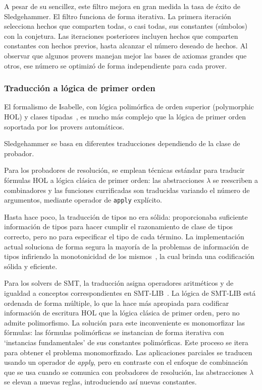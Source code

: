 \documentclass[12pt]{book}
\begin{document}
A pesar de su sencillez, este filtro mejora en gran medida la tasa de éxito de Sledgehammer. El filtro funciona de forma iterativa. La primera iteración selecciona hechos que comparten todas, o casi todas, sus constantes (símbolos) con la conjetura. Las iteraciones posteriores incluyen hechos que comparten constantes con hechos previos, hasta alcanzar el número deseado de hechos. Al observar que algunos provers manejan mejor las bases de axiomas grandes que otros, ese número se optimizó de forma independiente para cada prover.

\subsubsection{Traducción a lógica de primer orden}

El formalismo de Isabelle, con lógica polimórfica de orden superior (polymorphic HOL) y clases tipadas~\cite{proof_processing_Isabelle}, es mucho más complejo que la lógica de primer orden soportada por los provers automáticos.

Sledgehammer se basa en diferentes traducciones dependiendo de la clase de probador.

Para los probadores de resolución, se emplean técnicas estándar para traducir fórmulas HOL a lógica clásica de primer orden: las abstracciones $\lambda$ se reescriben a combinadores y las funciones currificadas son traducidas variando el número de argumentos, mediante operador de \texttt{apply} explícito.

Hasta hace poco, la traducción de tipos no era sólida: proporcionaba suficiente información de tipos para hacer cumplir el razonamiento de clase de tipos correcto, pero no para especificar el tipo de cada término. La implementación actual soluciona de forma segura la mayoría de la problemas de información de tipos infiriendo la monotonicidad de los mismos~\cite{monotonicity_inference_for_hol}, la cual brinda una codificación sólida y eficiente.

Para los solvers de SMT, la traducción asigna operadores aritméticos y de igualdad a conceptos correspondientes en SMT-LIB~\cite{SMT-LIB}. La lógica de SMT-LIB está ordenada de forma múltiple, lo que la hace más apropiada para codificar información de escritura HOL que la lógica clásica de primer orden, pero no admite polimorfismo. La solución para este inconveniente es monomorfizar las fórmulas: las fórmulas polimórficas se instancian de forma iterativa con `instancias fundamentales' de sus constantes polimórficas. Este proceso se itera para obtener el problema monomorfizado. Las aplicaciones parciales se traducen usando un operador de \textit{apply}, pero en contraste con el enfoque de combinación que se usa cuando se comunica con probadores de resolución, las abstracciones $\lambda$ se elevan a nuevas reglas, introduciendo así nuevas constantes.
\end{document}
